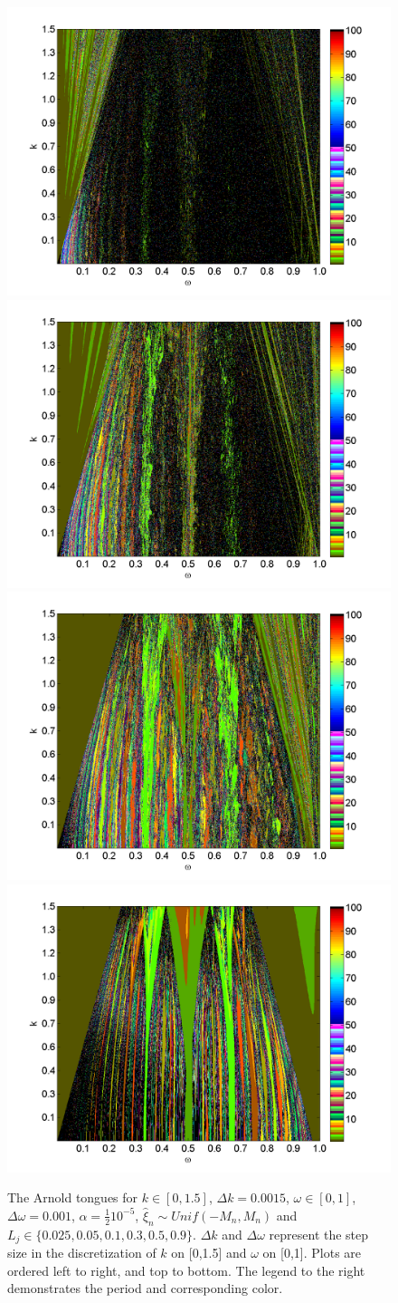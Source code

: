 \begin{figure}[H]\linespread{1}  
\caption[The Arnold tongues for the random circle map, uniform
distribution, $\alpha = \frac{1}{2}10^{-5}$]{The Arnold
  tongues for $k\in [0,1.5]$, $\Delta k = 0.0015$, $\omega \in [0,1]$,
  $\Delta \omega = 0.001$, $\alpha = \frac{1}{2}10^{-5}$, $\hat{\xi}_n\sim Unif(-M_n,M_n)$ and $L_j \in
  \{0.025,0.05,0.1,0.3,0.5,0.9\}$. $\Delta k$ and $\Delta \omega$
  represent the step size in the discretization of $k$ on [0,1.5] and $\omega$
  on [0,1]. Plots are ordered left to right,
  and top to bottom. The legend to the right demonstrates the period and corresponding color.}\label{fig:rcirctongues_u_ha}
\centering
\includegraphics[width=.5\textwidth]{figs/tongues_u_halfa_1000_L_0025.png}\hfill
\includegraphics[width=.5\textwidth]{figs/tongues_u_halfa_1000_L_005.png}\\
\includegraphics[width=.5\textwidth]{figs/tongues_u_halfa_1000_L_01.png}\hfill
\includegraphics[width=.5\textwidth]{figs/tongues_u_halfa_1000_L_03.png}\\

\end{figure}

